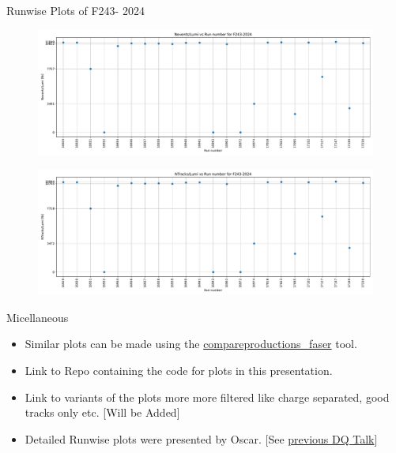 \begin{frame}{Runwise Plots of F243- 2024}
    \begin{figure}
        \centering
        \includegraphics[width=1.0\textwidth]{plots_runwise/NEventsbyLumi_2024_F243.pdf}
    \end{figure}
    \vspace{-0.35cm}
    \begin{figure}
        \centering
        \includegraphics[width=1.0\textwidth]{plots_runwise/NTracksbyLumi_2024_F243.pdf}
    \end{figure}
\end{frame}

\begin{frame}{Micellaneous}
    \begin{itemize}
        \item Similar plots can be made using the \href{https://gitlab.cern.ch/anburger/compareproductions_faser}{compareproductions\_faser} tool.
        \item Link to Repo containing the code for plots in this presentation.
        \item Link to variants of the plots more more filtered like charge separated, good tracks only etc. [Will be Added]
        \item Detailed Runwise plots were presented by Oscar. [See \href{https://indico.cern.ch/event/1476946/contributions/6220240/attachments/2970435/5227381/DQ2024.pdf}{previous DQ Talk}]
    \end{itemize}
    
\end{frame}